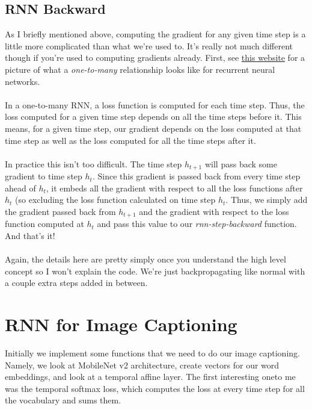 \documentclass[12pt]{article}
\begin{document}
\subsection{RNN Backward}
As I briefly mentioned above, computing the gradient for any given time step is
a little more complicated than what we're used to. It's really not much different
though if you're used to computing gradients already. First, see 
\href{https://calvinfeng.gitbook.io/machine-learning-notebook/supervised-learning/recurrent-neural-network/recurrent_neural_networks}
{this website} for a picture of what a \emph{one-to-many} relationship looks like 
for recurrent neural networks. 
~\\
~\\
In a one-to-many RNN, a loss function is computed for each time step. Thus, the loss 
computed for a given time step depends on all the time steps before it. This means, 
for a given time step, our gradient depends on the loss computed at that time step 
as well as the loss computed for all the time steps after it. 
~\\
~\\
In practice this isn't too difficult. The time step $h_{t + 1}$ will pass back some 
gradient to time step $h_t$. Since this gradient is passed back from every time 
step ahead of $h_t$, it embeds all the gradient with respect to all the loss functions 
after $h_t$ (so excluding the loss function calculated on time step $h_t$. Thus, 
we simply add the gradient passed back from $h_{t+1}$ and the gradient with respect 
to the loss function computed at $h_t$ and pass this value to our 
\emph{rnn-step-backward} function. And that's it! 
~\\
~\\
Again, the details here are pretty simply once you understand the high level 
concept so I won't explain the code. We're just backpropagating like normal 
with a couple extra steps added in between. 

\section{RNN for Image Captioning}

Initially we implement some functions that we need to do our image captioning. Namely, 
we look at MobileNet v2 architecture, create vectors for our word embeddings, and 
look at a temporal affine layer. The first interesting oneto me was the temporal softmax 
loss, which computes the loss at every time step for all the vocabulary and sums them. 
\end{document}

